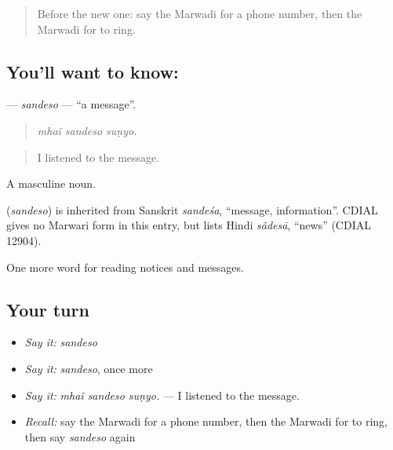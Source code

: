 \label{lesson:MW-C197-sandeso}



\begin{quote}
Before the new one: say the Marwadi for a phone number, then the Marwadi for to ring.
\end{quote}

\subsection*{You'll want to know: }
\textbf{} — \emph{sandeso} — \textquotedblleft{}a message\textquotedblright{}.

\begin{quote}
  
\end{quote}

\begin{quote}
\emph{mhaĩ sandeso suṇyo.}
\end{quote}

\begin{quote}
I listened to the message.
\end{quote}

A masculine noun.

\begin{cousinweb}
\textbf{} (\emph{sandeso}) is inherited from Sanskrit \emph{sandeśa}, \textquotedblleft{}message, information\textquotedblright{}. CDIAL gives no Marwari form in this entry, but lists Hindi \emph{sãdesā}, \textquotedblleft{}news\textquotedblright{} (CDIAL 12904).
\end{cousinweb}

\begin{grammarlens}[title={What you've built}]
One more word for reading notices and messages.
\end{grammarlens}

\subsection*{Your turn}
\begin{itemize}
\raggedright
  \item \emph{Say it:} \emph{sandeso}
  \item \emph{Say it:} \emph{sandeso}, once more
  \item \emph{Say it:} \emph{mhaĩ sandeso suṇyo.} — I listened to the message.
  \item \emph{Recall:} say the Marwadi for a phone number, then the Marwadi for to ring, then say \emph{sandeso} again
\end{itemize}

